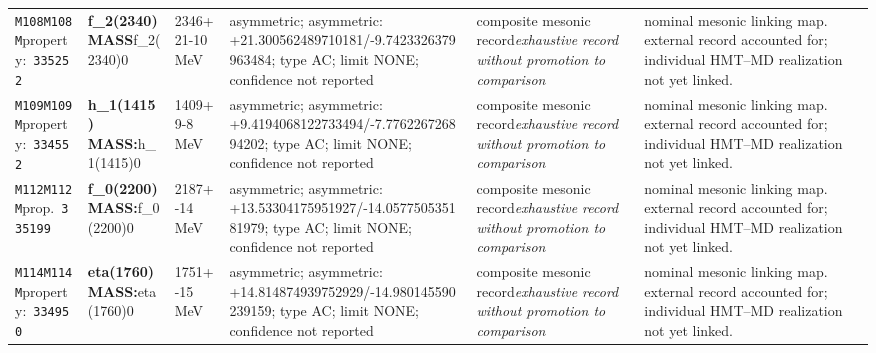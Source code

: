 \begin{landscape}
\begin{longtable}{L{1.85cm}L{4.45cm}L{2.35cm}L{4.05cm}L{3.35cm}L{7.15cm}}
\texttt{M108}\newline \texttt{M108M}\newline property:\ \texttt{335252} & \textbf{f\_\allowbreak{}2(2340) MASS}\newline f\_\allowbreak{}2(2340)0 & 2346+21-10\,MeV & asymmetric; asymmetric: +21.300562489710181/-9.7423326379963484; type AC; limit NONE; confidence not reported & composite mesonic record\newline \emph{exhaustive record without promotion to comparison} & nominal mesonic linking map. external record accounted for; individual HMT--MD realization not yet linked. \\
\texttt{M109}\newline \texttt{M109M}\newline property:\ \texttt{334552} & \textbf{h\_\allowbreak{}1(1415) MASS:}\newline h\_\allowbreak{}1(1415)0 & 1409+9-8\,MeV & asymmetric; asymmetric: +9.4194068122733494/-7.776226726894202; type AC; limit NONE; confidence not reported & composite mesonic record\newline \emph{exhaustive record without promotion to comparison} & nominal mesonic linking map. external record accounted for; individual HMT--MD realization not yet linked. \\
\texttt{M112}\newline \texttt{M112M}\newline prop.\ \texttt{335199} & \textbf{f\_\allowbreak{}0(2200) MASS:}\newline f\_\allowbreak{}0(2200)0 & 2187+-14\,MeV & asymmetric; asymmetric: +13.53304175951927/-14.057750535181979; type AC; limit NONE; confidence not reported & composite mesonic record\newline \emph{exhaustive record without promotion to comparison} & nominal mesonic linking map. external record accounted for; individual HMT--MD realization not yet linked. \\
\texttt{M114}\newline \texttt{M114M}\newline property:\ \texttt{334950} & \textbf{eta(1760) MASS:}\newline eta(1760)0 & 1751+-15\,MeV & asymmetric; asymmetric: +14.814874939752929/-14.980145590239159; type AC; limit NONE; confidence not reported & composite mesonic record\newline \emph{exhaustive record without promotion to comparison} & nominal mesonic linking map. external record accounted for; individual HMT--MD realization not yet linked. \\

\end{longtable}
\end{landscape}
